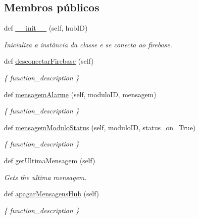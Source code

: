\subsection*{Membros públicos}
\begin{DoxyCompactItemize}
\item 
def \hyperlink{classhub_para_firebase_1_1_hub_para_firebase_a8553e4a8f4a5564e69a1ebac33e255b3}{\+\_\+\+\_\+init\+\_\+\+\_\+} (self, hub\+ID)
\begin{DoxyCompactList}\small\item\em Inicializa a instância da classe e se conecta ao firebase. \end{DoxyCompactList}\item 
def \hyperlink{classhub_para_firebase_1_1_hub_para_firebase_a8867ea8f38db645837f1c0ab0a4b207e}{desconectar\+Firebase} (self)
\begin{DoxyCompactList}\small\item\em \{ function\+\_\+description \} \end{DoxyCompactList}\item 
def \hyperlink{classhub_para_firebase_1_1_hub_para_firebase_aec0b9ed7691e78978716075fe999019a}{mensagem\+Alarme} (self, modulo\+ID, mensagem)
\begin{DoxyCompactList}\small\item\em \{ function\+\_\+description \} \end{DoxyCompactList}\item 
def \hyperlink{classhub_para_firebase_1_1_hub_para_firebase_af5dec8c9d356d058cbe37907a395ef0c}{mensagem\+Modulo\+Status} (self, modulo\+ID, status\+\_\+on=True)
\begin{DoxyCompactList}\small\item\em \{ function\+\_\+description \} \end{DoxyCompactList}\item 
def \hyperlink{classhub_para_firebase_1_1_hub_para_firebase_a8c00d07d181c47e4567b602947466abe}{get\+Ultima\+Mensagem} (self)
\begin{DoxyCompactList}\small\item\em Gets the ultima mensagem. \end{DoxyCompactList}\item 
def \hyperlink{classhub_para_firebase_1_1_hub_para_firebase_a434ba152fb00900dddfaf2f61e5d78b6}{apagar\+Mensagens\+Hub} (self)
\begin{DoxyCompactList}\small\item\em \{ function\+\_\+description \} \end{DoxyCompactList}\item 

\end{DoxyCompactItemize}
